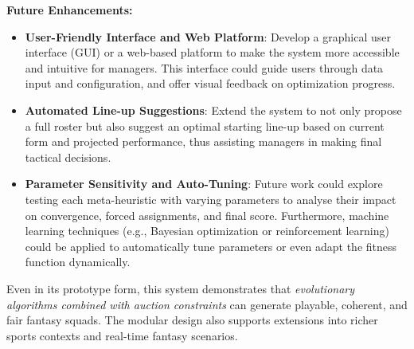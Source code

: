 \documentclass[sigconf]{acmart}
\begin{document}
	\textbf{Future Enhancements:}
\begin{itemize}
	\item \textbf{User-Friendly Interface and Web Platform}: Develop a graphical user interface (GUI) or a web-based platform to make the system more accessible and intuitive for managers. This interface could guide users through data input and configuration, and offer visual feedback on optimization progress.
	\item \textbf{Automated Line-up Suggestions}: Extend the system to not only propose a full roster but also suggest an optimal starting line-up based on current form and projected performance, thus assisting managers in making final tactical decisions.
	\item \textbf{Parameter Sensitivity and Auto-Tuning}: Future work could explore testing each meta-heuristic with varying parameters to analyse their impact on convergence, forced assignments, and final score. Furthermore, machine learning techniques (e.g., Bayesian optimization or reinforcement learning) could be applied to automatically tune parameters or even adapt the fitness function dynamically.
	
\end{itemize}
Even in its prototype form, this system demonstrates that \emph{evolutionary algorithms combined with auction constraints} can generate playable, coherent, and fair fantasy squads. The modular design also supports extensions into richer sports contexts and real-time fantasy scenarios.

	
	
\end{document}
